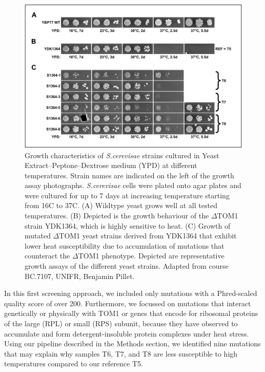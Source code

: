 \documentclass[10pt,a4paper]{article}
\begin{document}
\begin{figure}[h]
	\centering
	\includegraphics[width=0.7\linewidth]{img/yeastgrowth}
	\caption{\small Growth characteristics of \textit{S.cerevisae} strains cultured in Yeast Extract–Peptone–Dextrose medium (YPD) at different temperatures. Strain names are indicated on the left of the growth assay photographs. \textit{S.cerevisae} cells were plated onto agar plates and were cultured for up to 7 days at increasing temperature starting from 16\degree C to 37\degree C. (A) Wildtype yeast grows well at all tested temperatures. (B) Depicted is the growth behaviour of the $\Delta$TOM1 strain YDK1364, which is highly sensitive to heat. (C) Growth of mutated $\Delta$TOM1 yeast strains derived from YDK1364 that exhibit lower heat susceptibility due to accumulation of mutations that counteract the $\Delta$TOM1 phenotype. Depicted are representative growth assays of the different yeast strains. Adapted from course BC.7107, UNIFR, Benjamin Pillet.}
	\label{fig:yeastgrowth}
\end{figure}


\noindent In this first screening approach, we included only mutations with a Phred-scaled quality score of over 200. Furthermore, we focussed on mutations that interact genetically or physically with TOM1 or genes that encode for ribosomal proteins of the large (RPL) or small (RPS) subunit, because they have observed to accumulate and form detergent-insoluble protein complexes under heat stress. Using our pipeline described in the Methods section, we identified nine mutations that may explain why samples T6, T7, and T8 are less susceptible to high temperatures compared to our reference T5.
\end{document}
